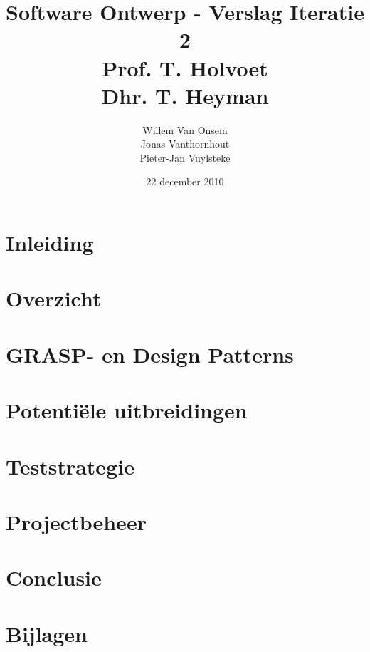 \documentclass[a4paper,titlepage]{article}
\title{Software Ontwerp - Verslag Iteratie 2\\Prof. T. Holvoet\\Dhr. T. Heyman}
\author{Willem Van Onsem\\Jonas Vanthornhout\\Pieter-Jan Vuylsteke}
\date{22 december 2010}
\begin{document}
\begin{titlepage}
\maketitle
\end{titlepage}
\tableofcontents
\newpage
\section*{Inleiding}

\newpage
\section{Overzicht}

\newpage
\section{GRASP- en Design Patterns}

\newpage
\section{Potenti\"ele uitbreidingen}

\newpage
\section{Teststrategie}

\newpage
\section{Projectbeheer}

\newpage
\section{Conclusie}

\newpage
\appendix
\section{Bijlagen}
\end{document}
